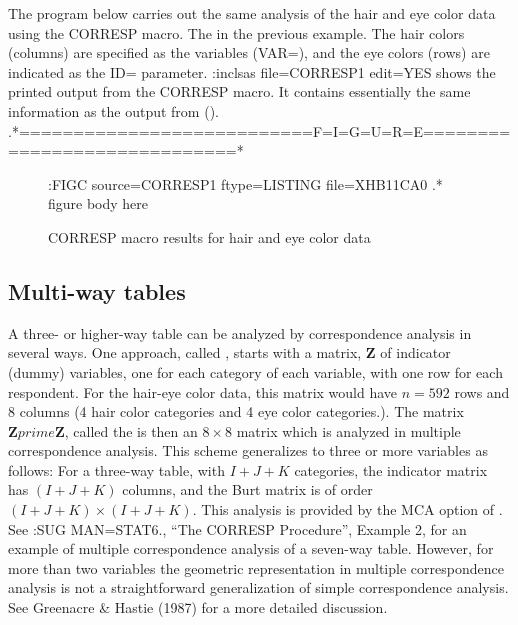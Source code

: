 The program below carries out the same analysis of the
hair and eye color data using the CORRESP macro.
The %
in the previous example.
The hair colors (columns)
are specified as the variables (VAR=), and the eye colors (rows)
are indicated as the ID= parameter.
:inclsas file=CORRESP1 edit=YES
 shows the printed output from the CORRESP
macro. It contains essentially the same information as
the output from  ().
.*===========================F=I=G=U=R=E=============================*
\begin{figure}\label{cahair1}
:FIGC source=CORRESP1 ftype=LISTING file=XHB11CA0
.* figure body here

\caption{CORRESP macro results for hair and eye color data}
\end{figure}

\subsection{Multi-way tables}
A three- or higher-way table can be analyzed by correspondence analysis in several ways.
One approach, called ,
starts with a matrix, \(\mathbf{Z}\) of
indicator (dummy) variables, one for
each category of each variable, with one row for each respondent.
For the hair-eye color data, this matrix would have \(n = 592\)
rows and 8 columns (4 hair color categories and 4 eye color categories.).
The matrix \(\mathbf{Z} prime  \mathbf{Z}\), called the 
is then an \(8 \times 8\) matrix which is analyzed in
multiple correspondence analysis.
This scheme generalizes to three or more variables as follows:
For a three-way table, with \(I + J + K\) categories,
the indicator matrix has \(( I + J + K )\) columns,
and the Burt matrix is of order
\(( I + J + K ) \times ( I + J + K )\).
This analysis is provided by the MCA option of .
See :SUG MAN=STAT6., ``The CORRESP Procedure'',
Example 2, for an example of multiple correspondence analysis of a seven-way table.
However, for more than two variables
the geometric representation in multiple correspondence analysis is
not a straightforward generalization of simple correspondence analysis.
See Greenacre & Hastie (1987) for a more detailed discussion.

